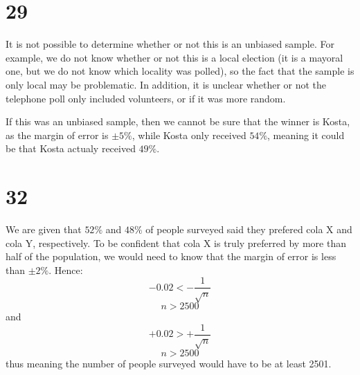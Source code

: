 \documentclass{article}
\theoremstyle{definition}
\newcommand{\?}{\stackrel{?}{=}}
\begin{document}
\section*{29}
It is not possible to determine whether or not this is an unbiased sample. For example, we do not know whether or not this is a local election (it is a mayoral one, 
but we do not know which locality was polled), so the fact that the sample is 
only local may be problematic. In addition, it is unclear whether or not the telephone poll only included volunteers, or if it was more random.


If this was an unbiased sample, then we cannot be sure that the winner is Kosta, as the margin of error is $\pm 5\%$, while Kosta only received $54\%$, meaning 
it could be that Kosta actualy received $49\%$.

\section*{32}
We are given that $52\%$ and $48\%$ of people surveyed said they prefered cola X and cola Y, respectively. To be confident that cola X is truly preferred by more than half of 
the population, we would need to know that the margin of error is less than $\pm 2\%$. Hence:
\[ -0.02<-\frac{1}{\sqrt{n}} \] \[ n>2500 \] and \[ +0.02>+\frac{1}{\sqrt{n}} \] \[ n>2500 \]
thus meaning the number of people surveyed would have to be at least 2501.
\end{document}
